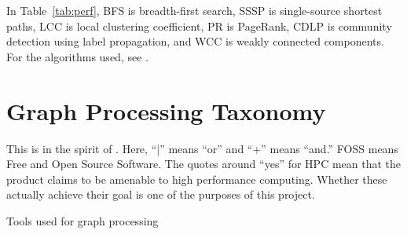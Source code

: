 \documentclass[conference]{IEEEtran}
\begin{document}
In Table~\ref{tab:perf}, BFS is breadth-first search, SSSP is single-source shortest paths, LCC is local clustering coefficient, PR is PageRank, CDLP is community detection using label propagation, and WCC is weakly connected components. For the algorithms used, see \cite{Iosup:2016:Graphalyticstech}.

\begin{table}[!htb]
	\centering

		\centering
	\caption{Performance Results for the \texttt{dota-league} dataset with 61,670 vertices and 50,870,313 edges.}
	\label{tab:perf}
\end{table}

\section{Graph Processing Taxonomy}
This is in the spirit of \cite{Doekemeijer:2015:GPFSurvey}. Here, ``|'' means ``or'' and ``+'' means ``and.'' FOSS means Free and Open Source Software. The quotes around ``yes'' for HPC mean that the product claims to be amenable to high performance computing. Whether these actually achieve their goal is one of the purposes of this project.
\begin{table*}[t]
	\begin{minipage}{\linewidth} %
		\centering
		\caption{Tools used for graph processing}
		\label{tab:frameworks}
	\end{minipage}
\end{table*}
\end{document}
